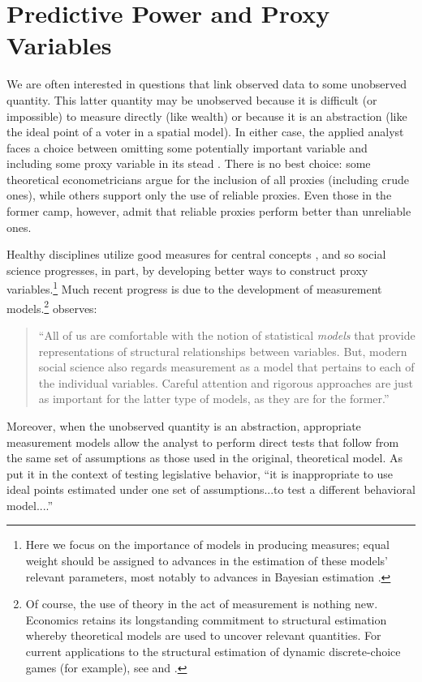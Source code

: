 \section{Predictive Power and Proxy Variables}

We are often interested in questions that link observed data to some unobserved quantity.
This latter quantity may be unobserved because it is difficult (or impossible) to measure directly (like wealth) or because it is an abstraction (like the ideal point of a voter in a spatial model).
In either case, the applied analyst faces a choice between omitting some potentially important variable and including some proxy variable in its stead \citep{stahlecker1993}.
There is no best choice: some theoretical econometricians \citep[e.g.][]{mccallum1972} argue for the inclusion of all proxies (including crude ones), while others \citep[e.g.][]{maddala1977} support only the use of reliable proxies.
Even those in the former camp, however, admit that reliable proxies perform better than unreliable ones.

Healthy disciplines utilize good measures for central concepts \citep{kuhn1977}, and so social science progresses, in part, by developing better ways to construct proxy variables.\footnote{Here we focus on the importance of models in producing measures; equal weight should be assigned to advances in the estimation of these models' relevant parameters, most notably to advances in Bayesian estimation \citep{jackman2001,martin2002,clinton2004,bafumi2005}.}
Much recent progress is due to the development of measurement models.\footnote{Of course, the use of theory in the act of measurement is nothing new.
  Economics retains its longstanding commitment to structural estimation whereby theoretical models are used to uncover relevant quantities.
  For current applications to the structural estimation of dynamic discrete-choice games (for example), see \citet{su2012} and \citet{egesdal2013}.} \citet[2]{jacoby2014} observes:
\begin{quote}
  ``All of us are comfortable with the notion of statistical \emph{models} that provide representations of structural relationships between variables.  But, modern social science also regards measurement as a model that pertains to each of the individual variables.  Careful attention and rigorous approaches are just as important for the latter type of models, as they are for the former.''
\end{quote}
Moreover, when the unobserved quantity is an abstraction, appropriate measurement models allow the analyst to perform direct tests that follow from the same set of assumptions as those used in the original, theoretical model.
As \citet[355]{clinton2004} put it in the context of testing legislative behavior, ``it is inappropriate to use ideal points estimated under one set of assumptions...to test a different behavioral model....''

